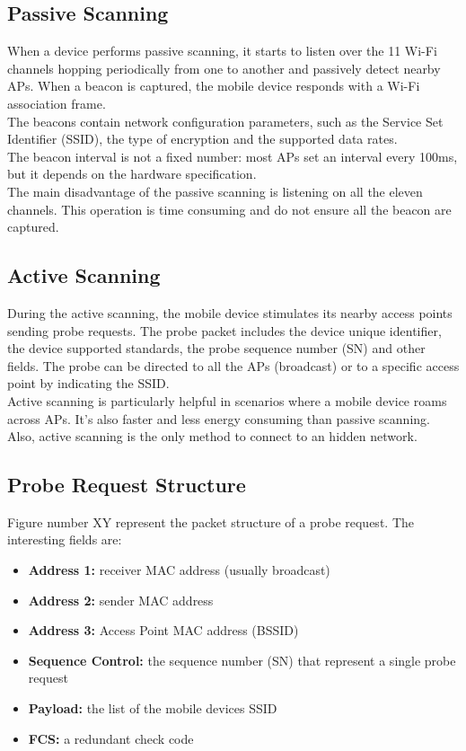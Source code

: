 \subsection{Passive Scanning}
When a device performs passive scanning, it starts to listen over the 11 Wi-Fi channels hopping periodically from one to another and passively detect nearby APs. When a beacon is captured, the mobile device responds with a Wi-Fi association frame.\\
The beacons contain network configuration parameters, such as the Service Set Identifier (SSID), the type of encryption and the supported data rates.\\
The beacon interval is not a fixed number: most APs set an interval every 100ms, but it depends on the hardware specification.\\
The main disadvantage of the passive scanning is listening on all the eleven channels. This operation is time consuming and do not ensure all the beacon are captured.
\subsection{Active Scanning}
During the active scanning, the mobile device stimulates its nearby access points sending probe requests. The probe packet includes the device unique identifier, the device supported standards, the probe sequence number (SN) and other fields. The probe can be directed to all the APs (broadcast) or to a specific access point by indicating the SSID. \\
Active scanning is particularly helpful in scenarios where a mobile device roams across APs. It's also faster and less energy consuming than passive scanning.\\
Also, active scanning is the only method to connect to an hidden network.
\newpage
\subsection{Probe Request Structure}
Figure number XY represent the packet structure of a probe request. The interesting fields are:
\begin{itemize}
\item \textbf{Address 1:} receiver MAC address (usually broadcast)
\item \textbf{Address 2:} sender MAC address
\item \textbf{Address 3:} Access Point MAC address (BSSID)
\item \textbf{Sequence Control:} the sequence number (SN) that represent a single probe request
\item \textbf{Payload:} the list of the mobile devices SSID
\item \textbf{FCS:} a redundant check code 
\end{itemize}

